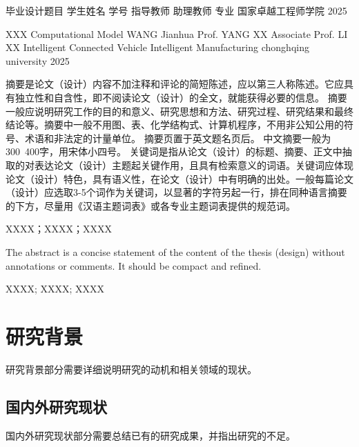 \documentclass{document}
\begin{document}
\makecovercn
  {毕业设计题目}
  {学生姓名}
  {学号}
  {指导教师}
  {助理教师}
  {专业}
  {国家卓越工程师学院}
  {2025}

\makecoveren
  {XXX Computational Model}
  {WANG Jianhua}
  {Prof. YANG XX}
  {Associate Prof. LI XX} 
  {Intelligent Connected Vehicle}
  {Intelligent Manufacturing}
  {chonghqing university}
  {2025} 

\begin{cquabstract}
    摘要是论文（设计）内容不加注释和评论的简短陈述，应以第三人称陈述。它应具有独立性和自含性，即不阅读论文（设计）的全文，就能获得必要的信息。
摘要一般应说明研究工作的目的和意义、研究思想和方法、研究过程、研究结果和最终结论等。摘要中一般不用图、表、化学结构式、计算机程序，不用非公知公用的符号、术语和非法定的计量单位。
摘要页置于英文题名页后。 
中文摘要一般为300~400字，用宋体小四号。 
关键词是指从论文（设计）的标题、摘要、正文中抽取的对表达论文（设计）主题起关键作用，且具有检索意义的词语。关键词应体现论文（设计）特色，具有语义性，在论文（设计）中有明确的出处。一般每篇论文（设计）应选取3-5个词作为关键词，以显著的字符另起一行，排在同种语言摘要的下方，尽量用《汉语主题词表》或各专业主题词表提供的规范词。
\end{cquabstract}
  
\begin{cqukeywords}
    XXXX；XXXX；XXXX
\end{cqukeywords}

\begin{cquabstracten}
  The abstract is a concise statement of the content of the thesis (design) without annotations or comments. It should be compact and refined.
\end{cquabstracten}

\begin{cqukeywordsen}
  XXXX; XXXX; XXXX
\end{cqukeywordsen}
  
\begin{cqucontents}
\end{cqucontents}




\pagestyle{essaystyle}


\section{研究背景}
研究背景部分需要详细说明研究的动机和相关领域的现状。

\subsection{国内外研究现状}
国内外研究现状部分需要总结已有的研究成果，并指出研究的不足。
\end{document}
